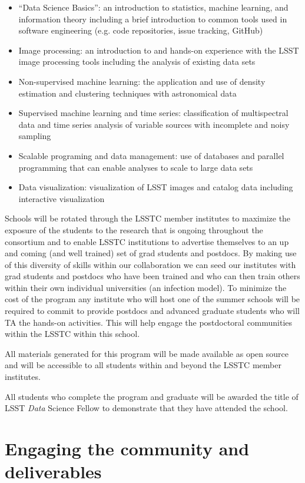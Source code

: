 \documentclass[nofootbib,floatfix,11pt]{article}
\begin{document}
\begin{itemize}
\item “Data Science Basics”: an introduction to statistics, machine learning, and information theory including a brief introduction to common tools used in software engineering (e.g. code repositories, issue tracking, GitHub)
\item Image processing: an introduction to and hands-on experience with the LSST image processing tools including the analysis of existing data sets
\item Non-supervised machine learning: the application and use of density estimation and clustering techniques with astronomical data
\item Supervised machine learning and time series: classification of multispectral data and time series analysis of variable sources with incomplete and noisy sampling
\item Scalable programing and data management: use of databases and parallel programming that can enable analyses to scale to large data sets
\item Data visualization: visualization of LSST images and catalog data including interactive visualization
\end{itemize}

Schools will be rotated through the LSSTC member institutes to maximize the exposure of the students to the research that is ongoing throughout the consortium and to enable LSSTC institutions to advertise themselves to an up and coming (and well trained) set of grad students and postdocs. By making use of this diversity of skills within our collaboration we can seed our institutes with grad students and postdocs who have been trained and who can then train others within their own individual universities (an infection model). To minimize the cost of the program any institute who will host one of the summer schools will be required to commit to provide postdocs and advanced graduate students who will TA the hands-on activities. This will help engage the postdoctoral communities within the LSSTC within this school. 

All materials generated for this program will be made available as open source and will be accessible to all students within and beyond the LSSTC member institutes.

All students who complete the program and graduate will be awarded the title of LSST {\em Data} Science Fellow to demonstrate that they have attended the school.

\section{Engaging the community and deliverables}
\end{document}
